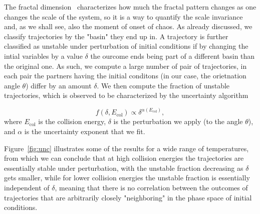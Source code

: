 \documentclass[%
 reprint,
 amsmath,amssymb,
 aps,
10pt
]{revtex4-1}
\begin{document}
The fractal dimension~\cite{mandelbrot1967} characterizes how much the fractal pattern changes as one changes the scale of the system, so it is a way to quantify the scale invariance and, as we shall see, also the moment of onset of chaos. As already discussed, we classify trajectories by the "basin" they end up in. A trajectory is further classified as unstable under perturbation of initial conditions if by changing the intial variables by a value $\delta$ the ourcome ends being part of a different basin than the original one. As such, we compute a large number of pair of trajectories, in each pair the partners having the initial conditons (in our case, the orietnation angle $\theta$) differ by an amount $\delta$. We then compute the fraction of unstable trajectories, which is observed to be characterized by the uncertainty algorithm~\cite{mcdonald1985}

\begin{equation}
f(\delta, E_{\mathrm{col}}) \propto \delta^{\alpha(E_{\mathrm{col}})},
\end{equation}
where $E_{\mathrm{col}}$ is the collision energy, $\delta$ is the perturbation we apply (to the angle $\theta$), and $\alpha$ is the uncertainty exponent that we fit.

Figure~\ref{fig:unc} illustrates some of the results for a wide range of temperatures, from which we can conclude that at high collision energies the trajectories are essentially stable under perturbation, with the unstable fraction decreasing as $\delta$ gets smaller, while for lower collision energies the unstable fraction is essentially independent of $\delta$, meaning that there is no correlation between the outcomes of trajectories that are arbitrarily closely "neighboring" in the phase space of initial conditions.
\end{document}
